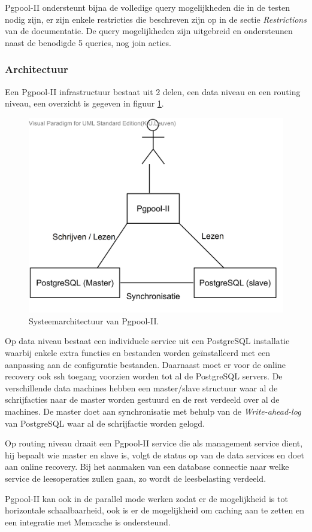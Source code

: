 Pgpool-II ondersteunt bijna de volledige query mogelijkheden die in de testen nodig zijn, er zijn enkele restricties die beschreven zijn op in de sectie \textit{Restrictions} van de documentatie\cite{pgpool-doc}. De query mogelijkheden zijn uitgebreid en ondersteunen naast de benodigde 5 queries, nog join acties. 

\subsubsection{Architectuur}
Een Pgpool-II infrastructuur bestaat uit 2 delen, een data niveau en een routing niveau, een overzicht is gegeven in figuur \ref{fig:Pgpool-structure}. 

\begin{figure}[h!]
\centering
\includegraphics[width=0.5\linewidth]{img/Pgpool-structuur}
\caption{Systeemarchitectuur van Pgpool-II.}
\label{fig:Pgpool-structure}
\end{figure}

Op data niveau bestaat een individuele service uit een PostgreSQL installatie waarbij enkele extra functies en bestanden worden geïnstalleerd met een aanpassing aan de configuratie bestanden.  Daarnaast moet er voor de online recovery ook ssh toegang voorzien worden tot al de PostgreSQL servers. De verschillende data machines hebben een master/slave structuur waar al de schrijfacties naar de master worden gestuurd en de rest verdeeld over al de machines. De master doet aan synchronisatie met behulp van de \textit{Write-ahead-log} van PostgreSQL waar al de schrijfactie worden gelogd. 

Op routing niveau draait een Pgpool-II service die als management service dient, hij bepaalt wie master en slave is, volgt de status op van de data services en doet aan online recovery. Bij het aanmaken van een database connectie naar welke service de leesoperaties zullen gaan, zo wordt de leesbelasting verdeeld. 

Pgpool-II kan ook in de parallel mode werken zodat er de mogelijkheid is tot horizontale schaalbaarheid, ook is er de mogelijkheid om caching aan te zetten en een integratie met Memcache is ondersteund. 

